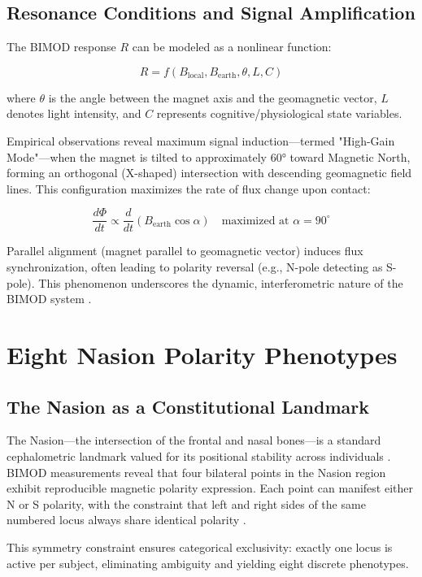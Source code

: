 \documentclass[12pt,a4paper]{article}
\begin{document}
\subsection{Resonance Conditions and Signal Amplification}

The BIMOD response \(R\) can be modeled as a nonlinear function:

\[
R = f(B_{\text{local}}, B_{\text{earth}}, \theta, L, C)
\]

where \(\theta\) is the angle between the magnet axis and the geomagnetic vector, \(L\) denotes light intensity, and \(C\) represents cognitive/physiological state variables.

Empirical observations reveal maximum signal induction—termed "High-Gain Mode"—when the magnet is tilted to approximately 60° toward Magnetic North, forming an orthogonal (X-shaped) intersection with descending geomagnetic field lines. This configuration maximizes the rate of flux change upon contact:

\[
\frac{d\Phi}{dt} \propto \frac{d}{dt}(B_{\text{earth}}\cos\alpha) \quad \text{maximized at } \alpha = 90^\circ
\]

Parallel alignment (magnet parallel to geomagnetic vector) induces flux synchronization, often leading to polarity reversal (e.g., N-pole detecting as S-pole). This phenomenon underscores the dynamic, interferometric nature of the BIMOD system \cite{yoon2026_001}.

\section{Eight Nasion Polarity Phenotypes}

\subsection{The Nasion as a Constitutional Landmark}

The Nasion—the intersection of the frontal and nasal bones—is a standard cephalometric landmark valued for its positional stability across individuals \cite{nasion_wikipedia}. BIMOD measurements reveal that four bilateral points in the Nasion region exhibit reproducible magnetic polarity expression. Each point can manifest either N or S polarity, with the constraint that left and right sides of the same numbered locus always share identical polarity \cite{yoon2026_003}.

This symmetry constraint ensures categorical exclusivity: exactly one locus is active per subject, eliminating ambiguity and yielding eight discrete phenotypes.
\end{document}
